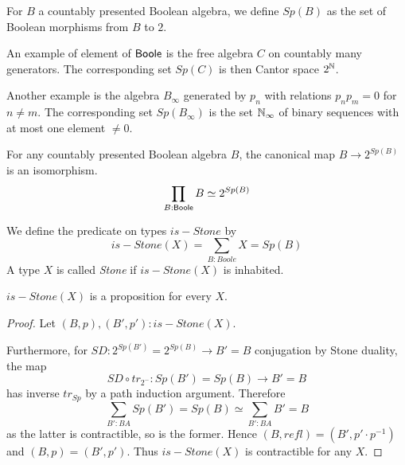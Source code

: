 \begin{definition}
  For $B$ a countably presented Boolean algebra, we define $Sp(B)$ as the set of Boolean morphisms from $B$ to $2$. 
\end{definition}

\medskip

An example of element of $\mathsf{Boole}$ is the free algebra $C$ on countably many generators. The corresponding set $Sp(C)$
is then Cantor space $2^{\mathbb{N}}$.

Another example is the algebra $B_{\infty}$ generated by $p_n$ with relations $p_np_m = 0$ for $n\neq m$. The corresponding
set $Sp(B_{\infty})$ is the set $\mathbb{N}_{\infty}$ of binary sequences with at most one element $\neq 0$.

\begin{axiom}
  For any countably presented Boolean algebra $B$, the canonical map   $B\rightarrow  2^{Sp(B)}$ is an isomorphism.
  \begin{equation}
    \prod_{B : \mathsf{Boole}} B \simeq 2^{Sp(B)}
  \end{equation} 
\end{axiom} 

\begin{definition}
  We define the predicate on types $is-Stone$ by 
  \begin{equation}
    is-Stone(X) = \sum\limits_{B : Boole} X = Sp(B)
  \end{equation} 
  A type $X$ is called \textit{Stone} if $is-Stone(X)$ is inhabited.
\end{definition}

\begin{lemma}
  $is-Stone(X)$ is a proposition for every $X$. 
\end{lemma} 
\begin{proof}
  Let $(B,p), (B',p'): is-Stone(X)$. 
  
  Furthermore, 
  for $SD: 2^{Sp(B')} = 2^{Sp(B)} \to B' = B$ conjugation by Stone duality, the map 
  $$SD \circ tr_{2^-} : Sp(B') = Sp(B) \to B' = B$$
  has inverse $tr_{Sp}$ by a path induction argument. 
  Therefore 
  $$
    \sum\limits_{B' : BA} Sp(B') = Sp(B)  
    \simeq 
    \sum\limits_{B' : BA} B' = B  
    $$
    as the latter is contractible, so is the former. 
    Hence $(B,refl) = (B', p' \cdot p ^{-1})$ and $(B,p) = (B',p')$. 
    Thus $is-Stone(X)$ is contractible for any $X$. 
\end{proof} 

